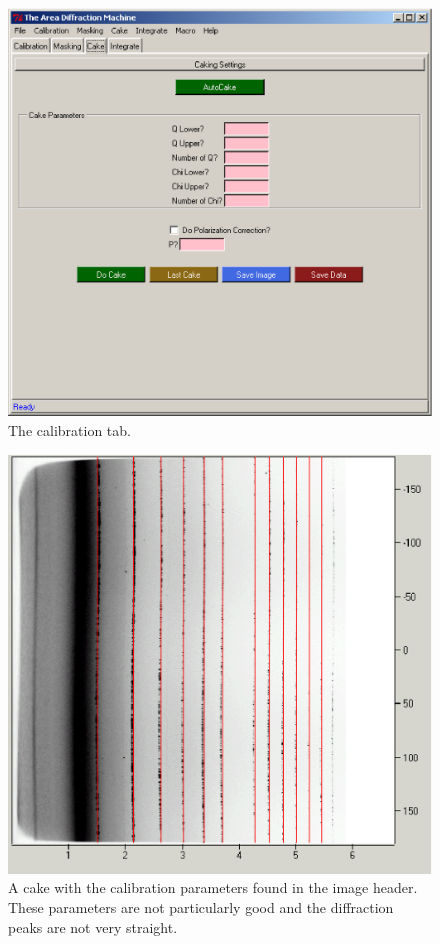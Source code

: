 \begin{figure}
    \centering
    \includegraphics[scale=.75]
    {figures/caking_tab.eps}
    \caption{The calibration tab.}
    \label{cake_tab_example}
\end{figure}

\begin{figure}
    \centering
    \includegraphics[scale=.75]
    {figures/bad_calibration_cake.eps}
    \caption{A cake with the calibration parameters
    found in the image header. These parameters
    are not particularly good and the diffraction peaks
    are not very straight.}
    \label{bad_calibration_cake}
\end{figure}

